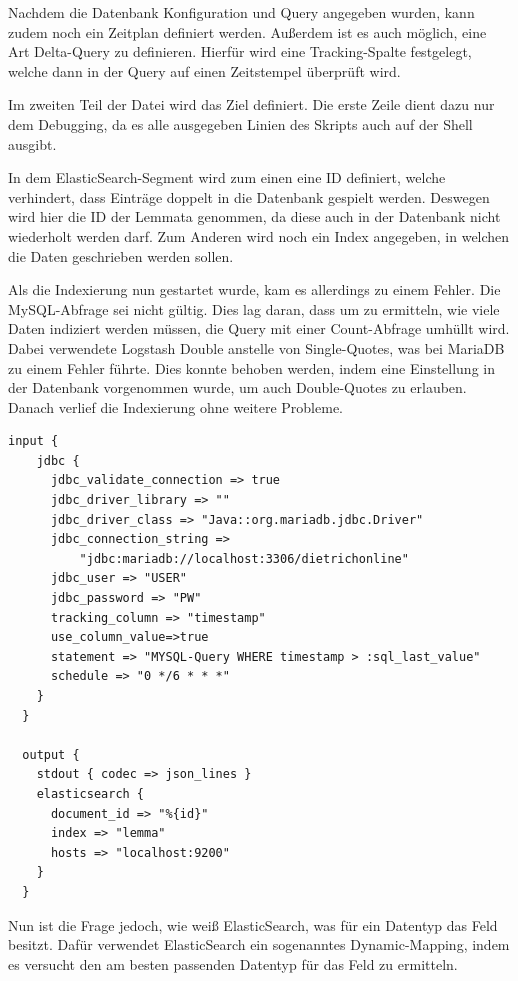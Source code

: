Nachdem die Datenbank Konfiguration und Query angegeben wurden, kann zudem noch ein Zeitplan definiert werden. Außerdem ist es auch möglich, eine Art Delta-Query zu definieren. Hierfür wird eine Tracking-Spalte festgelegt, welche dann in der Query auf einen Zeitstempel überprüft wird.

Im zweiten Teil der Datei wird das Ziel definiert. Die erste Zeile dient dazu nur dem Debugging, da es alle ausgegeben Linien des Skripts auch auf der Shell ausgibt. 

In dem ElasticSearch-Segment wird zum einen eine ID definiert, welche verhindert, dass Einträge doppelt in die Datenbank gespielt werden. Deswegen wird hier die ID der Lemmata genommen, da diese auch in der Datenbank nicht wiederholt werden darf. Zum Anderen wird noch ein Index angegeben, in welchen die Daten geschrieben werden sollen. 

Als die Indexierung nun gestartet wurde, kam es allerdings zu einem Fehler. Die MySQL-Abfrage sei nicht gültig. Dies lag daran, dass um zu ermitteln, wie viele Daten indiziert werden müssen, die Query mit einer Count-Abfrage umhüllt wird. Dabei verwendete Logstash Double anstelle von Single-Quotes, was bei MariaDB zu einem Fehler führte. Dies konnte behoben werden, indem eine Einstellung in der Datenbank vorgenommen wurde, um auch Double-Quotes zu erlauben. 
Danach verlief die Indexierung ohne weitere Probleme.

\begin{lstlisting}[language=xml, frame=single, label={lst:lsConf}] 
  input {
    jdbc {
      jdbc_validate_connection => true
      jdbc_driver_library => ""
      jdbc_driver_class => "Java::org.mariadb.jdbc.Driver"
      jdbc_connection_string =>
          "jdbc:mariadb://localhost:3306/dietrichonline"
      jdbc_user => "USER"
      jdbc_password => "PW"
      tracking_column => "timestamp"
      use_column_value=>true
      statement => "MYSQL-Query WHERE timestamp > :sql_last_value"
      schedule => "0 */6 * * *"
    }
  }
  
  output {
    stdout { codec => json_lines }
    elasticsearch {
      document_id => "%{id}"
      index => "lemma"
      hosts => "localhost:9200"
    }
  }
\end{lstlisting}

Nun ist die Frage jedoch, wie weiß ElasticSearch, was für ein Datentyp das Feld besitzt. Dafür verwendet ElasticSearch ein sogenanntes Dynamic-Mapping, indem es versucht den am besten passenden Datentyp für das Feld zu ermitteln.

